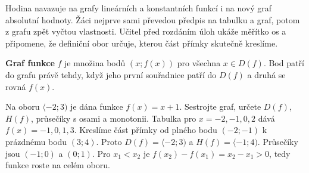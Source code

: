 \documentclass[11pt,a4paper]{article}
\begin{document}
Hodina navazuje na grafy lineárních a konstantních funkcí i na nový graf absolutní hodnoty. Žáci nejprve sami převedou předpis na tabulku a graf, potom z grafu zpět vyčtou vlastnosti. Učitel před rozdáním úloh ukáže měřítko os a připomene, že definiční obor určuje, kterou část přímky skutečně kreslíme.
\begin{definiceBox}
\textbf{Graf funkce} $f$ je množina bodů $(x;f(x))$ pro všechna $x\in D(f)$. Bod patří do grafu právě tehdy, když jeho první souřadnice patří do $D(f)$ a druhá se rovná $f(x)$.
\end{definiceBox}
\begin{prikladReseniBox}
Na oboru $\langle-2;3)$ je dána funkce $f(x)=x+1$. Sestrojte graf, určete $D(f)$, $H(f)$, průsečíky s osami a monotonii.
\tcblower
Tabulka pro $x=-2,-1,0,2$ dává $f(x)=-1,0,1,3$. Kreslíme část přímky od plného bodu $(-2;-1)$ k prázdnému bodu $(3;4)$. Proto $D(f)=\langle-2;3)$ a $H(f)=\langle-1;4)$. Průsečíky jsou $(-1;0)$ a $(0;1)$. Pro $x_1<x_2$ je $f(x_2)-f(x_1)=x_2-x_1>0$, tedy funkce roste na celém oboru.
\end{prikladReseniBox}
\begin{center}
\end{center}
\end{document}
